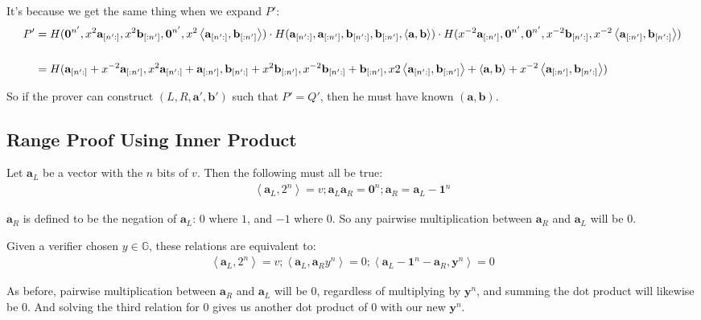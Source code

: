 \documentclass{article}
\begin{document}
It's because we get the same thing when we expand $P'$:
\begin{align}
  P' &= H(\textbf{0}^{n'}, x^2 \textbf{a}_{[n':]}, x^2 \textbf{b}_{[:n']}, \textbf{0}^{n'}, x^2 \left<\textbf{a}_{[n':]}, \textbf{b}_{[:n']}\right>) \cdot H(\textbf{a}_{[n':]}, \textbf{a}_{[:n']}, \textbf{b}_{[n':]}, \textbf{b}_{[:n']}, \left<\textbf{a}, \textbf{b}\right>) \cdot H(x^{-2} \textbf{a}_{[:n']}, \textbf{0}^{n'}, \textbf{0}^{n'}, x^{-2} \textbf{b}_{[n':]}, x^{-2} \left<\textbf{a}_{[:n']}, \textbf{b}_{[n':]}\right>)\\
  \cr &= H(\textbf{a}_{[n':]} + x^{-2} \textbf{a}_{[:n']}, x^2 \textbf{a}_{[n':]} + \textbf{a}_{[:n']}, \textbf{b}_{[n':]} + x^2 \textbf{b}_{[:n']}, x^{-2} \textbf{b}_{[n':]} + \textbf{b}_{[:n']}, x2 \left<\textbf{a}_{[n':]}, \textbf{b}_{[:n']}\right> + \left<\textbf{a}, \textbf{b}\right> + x^{-2} \left<\textbf{a}_{[:n']}, \textbf{b}_{[n':]}\right>)
\end{align}

So if the prover can construct $(L, R, \textbf{a}', \textbf{b}')$ such that $P' = Q'$, then he must have known $(\textbf{a}, \textbf{b})$.


\subsection{Range Proof Using Inner Product}

Let $\textbf{a}_L$ be a vector with the $n$ bits of $v$.  Then the following must all be true:
\begin{align}
  \left<\textbf{a}_L, 2^n\right> = v ; \textbf{a}_L \textbf{a}_R = \textbf{0}^n ; \textbf{a}_R = \textbf{a}_L - \textbf{1}^n
\end{align}
  
$\textbf{a}_R$ is defined to be the negation of $\textbf{a}_L$: $0$ where $1$, and $-1$ where $0$.  So any pairwise multiplication between $\textbf{a}_R$ and $\textbf{a}_L$ will be $0$.

Given a verifier chosen $y \in \mathbb{G}$, these relations are equivalent to:
\begin{align}
  \left<\textbf{a}_L, 2^n\right> = v ; \left<\textbf{a}_L,  \textbf{a}_R y^n\right> = 0 ; \left<\textbf{a}_L - \textbf{1}^n - \textbf{a}_R, \textbf{y}^n\right> = 0
\end{align}

As before, pairwise multiplication between $\textbf{a}_R$ and $\textbf{a}_L$ will be $0$, regardless of multiplying by $\textbf{y}^n$, and summing the dot product will likewise be $0$. And solving the third relation for $0$ gives us another dot product of $0$ with our new $\textbf{y}^n$.
\end{document}
